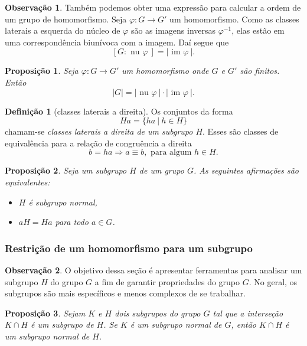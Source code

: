 \documentclass[a4paper,12pt]{report}
\theoremstyle{plain}
\newtheorem{proposicao}{Proposição}[section]
\theoremstyle{definition}
\newtheorem{definicao}{Definição}[section]
\newtheorem{observacao}{Observação}[section]
\begin{document}
\begin{observacao}
	Também podemos obter uma expressão para calcular a ordem de um grupo de
	homomorfismo. Seja \(\varphi: G\longrightarrow G'\) um homomorfismo.
	Como as classes laterais a esquerda do núcleo de \(\varphi\) são as imagens
	inversas \(\varphi^{-1}\), elas estão em uma correspondência biunívoca
	com a imagem. Daí segue que
	\[[G:\text{ nu }\varphi\ ] = |\text{ im }\varphi\ |.\]
\end{observacao}

\begin{proposicao}
	Seja \(\varphi: G\longrightarrow G'\) um
	homomorfismo onde \(G\) e \(G'\) são finitos. Então
	\[|G| = |\text{ nu }\varphi\ |\cdot|\text{ im }\varphi\ |.\]	
\end{proposicao}

\begin{definicao}[classes laterais a direita]
	Os conjuntos da forma
	\[Ha = \{ha \ | \ h \in H\}\] chamam-se \emph{classes laterais a direita de um
		subgrupo \(H\)}. Esses são classes de equivalência para a relação de
	congruência a direita
	\[b = ha \Rightarrow a \equiv b, \text{ para algum }h \in H.\]	
\end{definicao}

\begin{proposicao}
	Seja um subgrupo \(H\) de um grupo \(G\). As
	seguintes afirmações são equivalentes:
	
	\begin{itemize}
		\item
		\(H\) é subgrupo normal,
		\item
		\(aH = Ha\) para todo \(a\in G\).
	\end{itemize}	
\end{proposicao}

\subsubsection{Restrição de um homomorfismo para um subgrupo}

\begin{observacao}
	O objetivo dessa seção é apresentar ferramentas para analisar um subgrupo \(H\)
	do grupo \(G\) a fim de garantir propriedades do grupo \(G\). No geral,
	os subgrupos são mais específicos e menos complexos de se trabalhar.
\end{observacao}

\begin{proposicao}
	Sejam \(K\) e \(H\) dois subgrupos do grupo \(G\)
	tal que a interseção \(K\cap H\) é um subgrupo de \(H\). Se \(K\) é um
	subgrupo normal de \(G\), então \(K\cap H\) é um subgrupo normal de
	\(H\).	
\end{proposicao}
\end{document}
